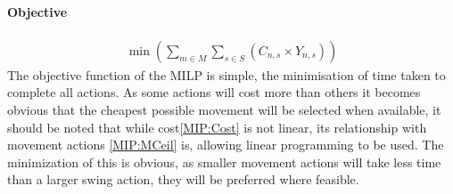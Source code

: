\paragraph*{Objective}
\begin{align}
\label{MIP:OBJ}
\min\left(\sum_{m\in M}\sum_{s\in S} (C_{n,s}\times Y_{n,s})\right)
\end{align}
The objective function of the MILP is simple, the minimisation of time taken to complete all actions. As some actions will cost more than others it becomes obvious that the cheapest possible movement will be selected when available, it should be noted that while cost\ref{MIP:Cost} is not linear, its relationship with movement actions \ref{MIP:MCeil} is, allowing linear programming to be used. The minimization of this is obvious, as smaller movement actions will take less time than a larger swing action, they will be preferred where feasible. 
